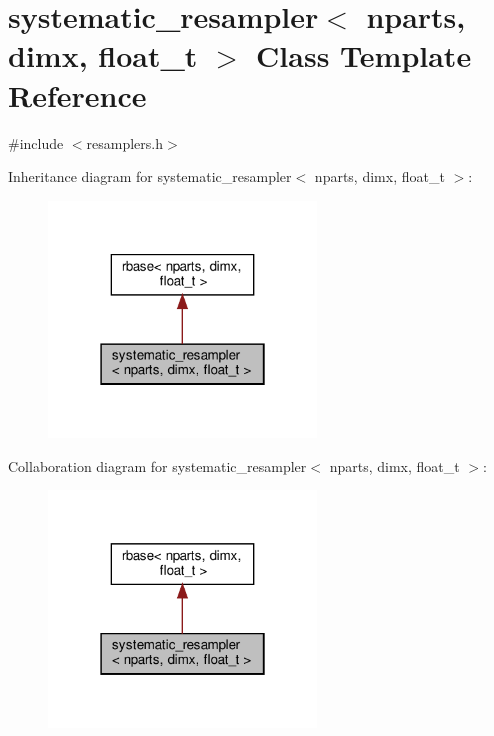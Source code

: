 \hypertarget{classsystematic__resampler}{}\section{systematic\+\_\+resampler$<$ nparts, dimx, float\+\_\+t $>$ Class Template Reference}
\label{classsystematic__resampler}


{\ttfamily \#include $<$resamplers.\+h$>$}



Inheritance diagram for systematic\+\_\+resampler$<$ nparts, dimx, float\+\_\+t $>$\+:
\nopagebreak
\begin{figure}[H]
\begin{center}
\leavevmode
\includegraphics[width=202pt]{classsystematic__resampler__inherit__graph}
\end{center}
\end{figure}


Collaboration diagram for systematic\+\_\+resampler$<$ nparts, dimx, float\+\_\+t $>$\+:
\nopagebreak
\begin{figure}[H]
\begin{center}
\leavevmode
\includegraphics[width=202pt]{classsystematic__resampler__coll__graph}
\end{center}
\end{figure}
